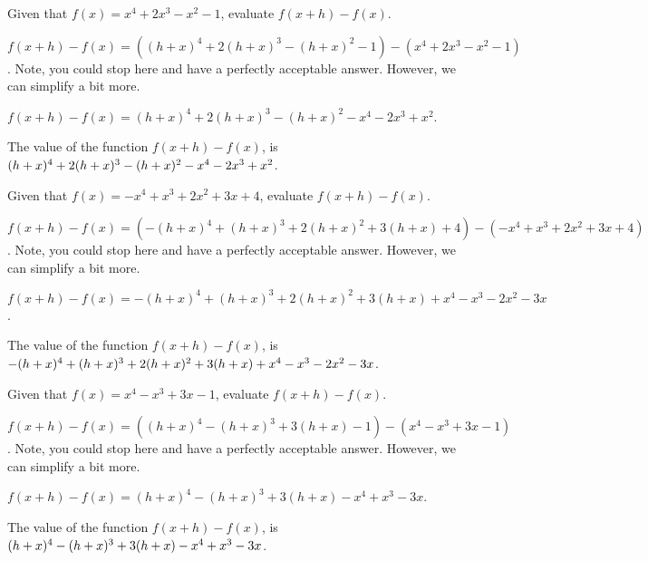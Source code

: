 \begin{shuffle}
\begin{exercise}
Given that $f(x)=x^4+2 x^3-x^2-1$, evaluate $f(x+h)-f(x)$.
\begin{solution}
\begin{hint}
$f(x+h)-f(x)=((h+x)^4+2 (h+x)^3-(h+x)^2-1)-(x^4+2 x^3-x^2-1)$. Note, you could stop here and have a perfectly acceptable answer. However, we can simplify a bit more.
\end{hint}
\begin{hint}
$f(x+h)-f(x)=(h+x)^4+2 (h+x)^3-(h+x)^2-x^4-2 x^3+x^2$.
\end{hint}
The value of the function $f(x+h)-f(x)$, is ${(h+x)^4+2 (h+x)^3-(h+x)^2-x^4-2 x^3+x^2}$.
\end{solution}
\end{exercise}

\begin{exercise}
Given that $f(x)=-x^4+x^3+2 x^2+3 x+4$, evaluate $f(x+h)-f(x)$.
\begin{solution}
\begin{hint}
$f(x+h)-f(x)=(-(h+x)^4+(h+x)^3+2 (h+x)^2+3 (h+x)+4)-(-x^4+x^3+2 x^2+3 x+4)$. Note, you could stop here and have a perfectly acceptable answer. However, we can simplify a bit more.
\end{hint}
\begin{hint}
$f(x+h)-f(x)=-(h+x)^4+(h+x)^3+2 (h+x)^2+3 (h+x)+x^4-x^3-2 x^2-3 x$.
\end{hint}
The value of the function $f(x+h)-f(x)$, is ${-(h+x)^4+(h+x)^3+2 (h+x)^2+3 (h+x)+x^4-x^3-2 x^2-3 x}$.
\end{solution}
\end{exercise}

\begin{exercise}
Given that $f(x)=x^4-x^3+3 x-1$, evaluate $f(x+h)-f(x)$.
\begin{solution}
\begin{hint}
$f(x+h)-f(x)=((h+x)^4-(h+x)^3+3 (h+x)-1)-(x^4-x^3+3 x-1)$. Note, you could stop here and have a perfectly acceptable answer. However, we can simplify a bit more.
\end{hint}
\begin{hint}
$f(x+h)-f(x)=(h+x)^4-(h+x)^3+3 (h+x)-x^4+x^3-3 x$.
\end{hint}
The value of the function $f(x+h)-f(x)$, is ${(h+x)^4-(h+x)^3+3 (h+x)-x^4+x^3-3 x}$.
\end{solution}
\end{exercise}
\end{shuffle}
